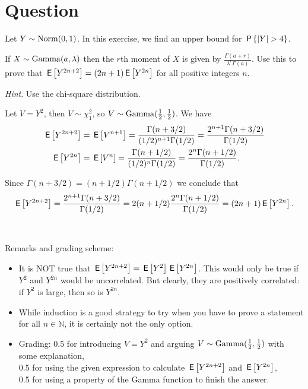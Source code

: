 \section{Question}

Let $Y \sim \Norm{0,1}$. 
In this exercise, we find an upper bound for $\P{|Y| > 4}$.

\begin{exercise}[1.5]
If $X \sim \Gamm{a, \lambda}$ then the $r$th moment of $X$ is given by $\frac{\Gamma(a+r)}{\lambda^r\Gamma(a)}$. 
Use this to prove that  $\E{Y^{2n+2}} = (2n+1)\E{Y^{2n}}$ for all positive integers $n$.

\textit{Hint}. Use the chi-square distribution. \\
\begin{solution}
Let $V = Y^2$, then  $V \sim \chi^2_1$, so $V  \sim \Gamm{\tfrac12, \tfrac12}$. We have 
\begin{align*} \E{Y^{2n+2}} &= \E{V^{n+1}} =  \frac{\Gamma(n+3/2)}{(1/2)^{n+1}\Gamma(1/2)} = \frac{2^{n+1}\Gamma(n+3/2)}{\Gamma(1/2)} \\ 
  \E{Y^{2n}} &= \E{V^n}  =  \frac{\Gamma(n+1/2)}{(1/2)^n\Gamma(1/2)} = \frac{2^n\Gamma(n+1/2)}{\Gamma(1/2)}. \end{align*}

Since $\Gamma(n+3/2) = (n+1/2) \Gamma(n+1/2)$ we conclude that $$\E{Y^{2n+2}}  = \frac{2^{n+1}\Gamma(n+3/2)}{\Gamma(1/2)} = 2(n+1/2)\frac{2^n\Gamma(n+1/2)}{\Gamma(1/2)} = (2n+1)\E{Y^{2n}}.$$  \\ \\

\noindent Remarks and grading scheme:

\begin{itemize}
\item It is NOT true that $\E{Y^{2n+2}} = \E{Y^{2}}\E{Y^{2n}}$. This would only be true if $Y^2$ and $Y^{2n}$ would be uncorrelated. But clearly, they are positively correlated: if $Y^2$ is large, then so is $Y^{2n}$.
\item While induction is a good strategy to try when you have to prove a statement for all $n \in \mathbb N$, it is certainly not the only option. 
\item Grading: 0.5 for introducing $V = Y^2$ and arguing $V  \sim \Gamm{\tfrac12, \tfrac12}$ with some explanation, \\ 0.5 for using the given expression to calculate  $\E{Y^{2n+2}}$ and $\E{Y^{2n}}$, \\
 0.5 for using a property of the Gamma function to finish the answer.
\end{itemize}
\end{solution}
\end{exercise}

